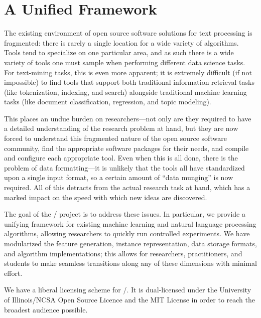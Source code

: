 \section{A Unified Framework}

The existing environment of open source software solutions for text processing
is fragmented: there is rarely a single location for a wide variety of
algorithms. Tools tend to specialize on one particular area, and as such there
is a wide variety of tools one must sample when performing different data
science tasks. For text-mining tasks, this is even more apparent; it is
extremely difficult (if not impossible) to find tools that support both
traditional information retrieval tasks (like tokenization, indexing, and
search) alongside traditional machine learning tasks (like document
classification, regression, and topic modeling).

This places an undue burden on researchers---not only are they required to have
a detailed understanding of the research problem at hand, but they are now
forced to understand this fragmented nature of the open source software
community, find the appropriate software packages for their needs, and compile
and configure each appropriate tool. Even when this is all done, there is the
problem of data formatting---it is unlikely that the tools all have standardized
upon a single input format, so a certain amount of ``data munging'' is now
required. All of this detracts from the actual research task at hand, which has
a marked impact on the speed with which new ideas are discovered.

The goal of the \meta/ project is to address these issues. In particular, we
provide a unifying framework for existing machine learning and natural language
processing algorithms, allowing researchers to quickly run controlled
experiments. We have modularized the feature generation, instance
representation, data storage formats, and algorithm implementations; this allows
for researchers, practitioners, and students to make seamless transitions along
any of these dimensions with minimal effort.

We have a liberal licensing scheme for \meta/. It is dual-licensed under the
University of Illinois/NCSA Open Source Licence and the MIT License in order to
reach the broadest audience possible.

